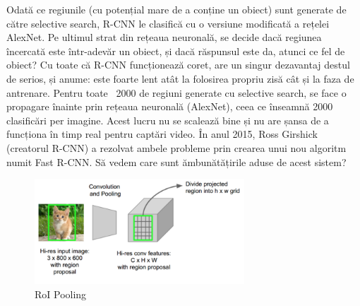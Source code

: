 Odată ce regiunile (cu potențial mare de a conține un obiect) sunt generate de către selective search, R-CNN le clasifică cu o versiune modificată a rețelei AlexNet. Pe ultimul strat din rețeaua neuronală, se decide dacă regiunea încercată este într-adevăr un obiect, și dacă răspunsul este da, atunci ce fel de obiect?\newline
Cu toate că R-CNN funcționează coret, are un singur dezavantaj destul de serios, și anume: este foarte lent atât la folosirea propriu zisă cât și la faza de antrenare. Pentru toate ~2000 de regiuni generate cu selective search, se face o propagare înainte prin rețeaua neuronală (AlexNet), ceea ce înseamnă 2000 clasificări per imagine. Acest lucru nu se scalează bine și nu are șansa de a funcționa în timp real pentru captări video.\newline
În anul 2015, Ross Girshick (creatorul R-CNN) a rezolvat ambele probleme prin crearea unui nou algoritm numit Fast R-CNN. Să vedem care sunt ămbunătățirile aduse de acest sistem?
\begin{figure}[h!]
    	\centering
	\captionsetup{justification=centering, margin=2cm}
	\includegraphics[width=0.7\textwidth]{figures/fast_rcnn.png}
	\caption{RoI Pooling \cite{historyCNN}}
	\label{fig:roi_pooling}
\end{figure}
